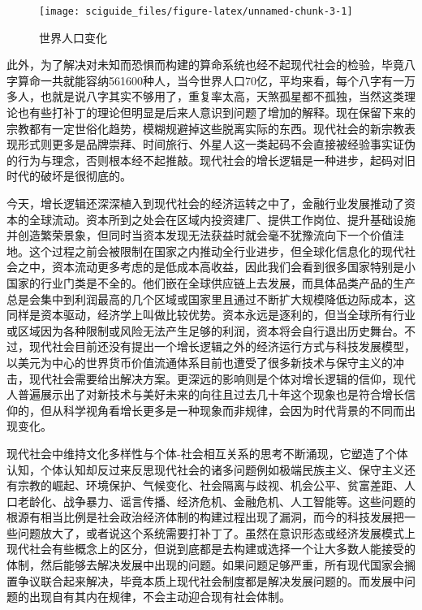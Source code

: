 \documentclass[]{tufte-book}
\begin{document}
\begin{figure}
\texttt{[image: sciguide\_files/figure-latex/unnamed-chunk-3-1]} \caption[世界人口变化]{世界人口变化}\label{fig:unnamed-chunk-3}
\end{figure}

此外，为了解决对未知而恐惧而构建的算命系统也经不起现代社会的检验，毕竟八字算命一共就能容纳561600种人，当今世界人口70亿，平均来看，每个八字有一万多人，也就是说八字其实不够用了，重复率太高，天煞孤星都不孤独，当然这类理论也有些打补丁的理论但明显是后来人意识到问题了增加的解释。现在保留下来的宗教都有一定世俗化趋势，模糊规避掉这些脱离实际的东西。现代社会的新宗教表现形式则更多是品牌崇拜、时间旅行、外星人这一类起码不会直接被经验事实证伪的行为与理念，否则根本经不起推敲。现代社会的增长逻辑是一种进步，起码对旧时代的破坏是很彻底的。

今天，增长逻辑还深深植入到现代社会的经济运转之中了，金融行业发展推动了资本的全球流动。资本所到之处会在区域内投资建厂、提供工作岗位、提升基础设施并创造繁荣景象，但同时当资本发现无法获益时就会毫不犹豫流向下一个价值洼地。这个过程之前会被限制在国家之内推动全行业进步，但全球化信息化的现代社会之中，资本流动更多考虑的是低成本高收益，因此我们会看到很多国家特别是小国家的行业门类是不全的。他们嵌在全球供应链上去发展，而具体品类产品的生产总是会集中到利润最高的几个区域或国家里且通过不断扩大规模降低边际成本，这同样是资本驱动，经济学上叫做比较优势。资本永远是逐利的，但当全球所有行业或区域因为各种限制或风险无法产生足够的利润，资本将会自行退出历史舞台。不过，现代社会目前还没有提出一个增长逻辑之外的经济运行方式与科技发展模型，以美元为中心的世界货币价值流通体系目前也遭受了很多新技术与保守主义的冲击，现代社会需要给出解决方案。更深远的影响则是个体对增长逻辑的信仰，现代人普遍展示出了对新技术与美好未来的向往且过去几十年这个现象也是符合增长信仰的，但从科学视角看增长更多是一种现象而非规律，会因为时代背景的不同而出现变化。

现代社会中维持文化多样性与个体-社会相互关系的思考不断涌现，它塑造了个体认知，个体认知却反过来反思现代社会的诸多问题例如极端民族主义、保守主义还有宗教的崛起、环境保护、气候变化、社会隔离与歧视、机会公平、贫富差距、人口老龄化、战争暴力、谣言传播、经济危机、金融危机、人工智能等。这些问题的根源有相当比例是社会政治经济体制的构建过程出现了漏洞，而今的科技发展把一些问题放大了，或者说这个系统需要打补丁了。虽然在意识形态或经济发展模式上现代社会有些概念上的区分，但说到底都是去构建或选择一个让大多数人能接受的体制，然后能够去解决发展中出现的问题。如果问题足够严重，所有现代国家会搁置争议联合起来解决，毕竟本质上现代社会制度都是解决发展问题的。而发展中问题的出现自有其内在规律，不会主动迎合现有社会体制。
\end{document}
